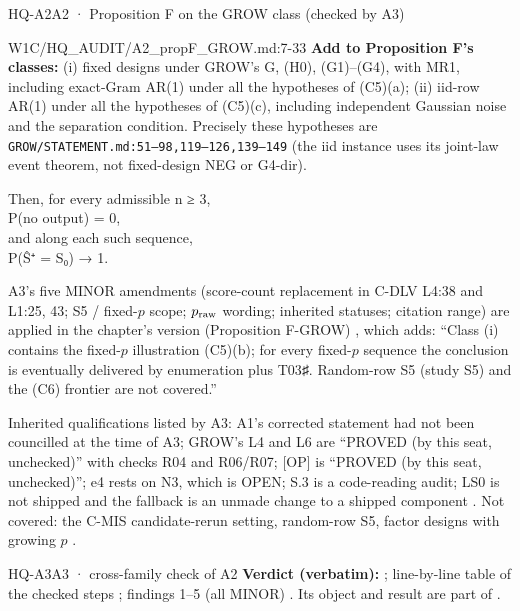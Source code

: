 \begin{card}{HQ-A2}{A2 · Proposition F on the GROW class (checked by A3)}
\begin{stmt}{W1C/HQ_AUDIT/A2_propF_GROW.md:7-33}
\textbf{Add to Proposition F's classes:} (i) fixed designs under GROW's G, (H0), (G1)–(G4), with MR1, including exact-Gram AR(1) under all the hypotheses of (C5)(a); (ii) iid-row AR(1) under all the hypotheses of (C5)(c), including independent Gaussian noise and the separation condition. Precisely these hypotheses are \texttt{GROW/STATEMENT.md:51–98,119–126,139–149} (the iid instance uses its joint-law event theorem, not fixed-design NEG or G4-dir).

Then, for every admissible n ≥ 3,\\
\hspace*{2em}P(no output) = 0,\\
and along each such sequence,\\
\hspace*{2em}P(Ŝ⁺ = S₀) → 1.
\end{stmt}
A3's five MINOR amendments (score-count replacement in C-DLV L4:38 and L1:25, 43; S5 / fixed-$p$ scope; $p_{\rm raw}$ wording; inherited statuses; citation range)  are applied in the chapter's version (Proposition F-GROW) , which adds: ``Class (i) contains the fixed-$p$ illustration (C5)(b); for every fixed-$p$ sequence the conclusion is eventually delivered by enumeration plus T03♯. Random-row S5 (study S5) and the (C6) frontier are not covered.''
\begin{notproved}
Inherited qualifications listed by A3: A1's corrected statement had not been councilled at the time of A3; GROW's L4 and L6 are ``PROVED (by this seat, unchecked)'' with checks R04 and R06/R07; [OP] is ``PROVED (by this seat, unchecked)''; e4 rests on N3, which is OPEN; S.3 is a code-reading audit; LS0 is not shipped and the fallback is an unmade change to a shipped component . Not covered: the C-MIS candidate-rerun setting, random-row S5, factor designs with growing $p$ .
\end{notproved}
\end{card}

\begin{card}{HQ-A3}{A3 · cross-family check of A2}
\textbf{Verdict (verbatim):}  ; line-by-line table of the checked steps ; findings 1--5 (all MINOR) . Its object and result are part of .
\end{card}


